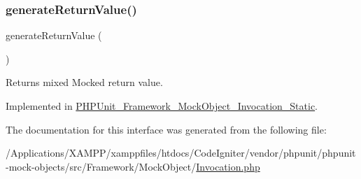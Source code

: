 \subsubsection{\texorpdfstring{generate\+Return\+Value()}{generateReturnValue()}}
{\footnotesize\ttfamily generate\+Return\+Value (\begin{DoxyParamCaption}{ }\end{DoxyParamCaption})}

\begin{DoxyReturn}{Returns}
mixed Mocked return value. 
\end{DoxyReturn}


Implemented in \mbox{\hyperlink{class_p_h_p_unit___framework___mock_object___invocation___static_af64f7ab3f0f61dbcf7e63601099137d1}{P\+H\+P\+Unit\+\_\+\+Framework\+\_\+\+Mock\+Object\+\_\+\+Invocation\+\_\+\+Static}}.



The documentation for this interface was generated from the following file\+:\begin{DoxyCompactItemize}
\item 
/\+Applications/\+X\+A\+M\+P\+P/xamppfiles/htdocs/\+Code\+Igniter/vendor/phpunit/phpunit-\/mock-\/objects/src/\+Framework/\+Mock\+Object/\mbox{\hyperlink{_invocation_8php}{Invocation.\+php}}\end{DoxyCompactItemize}
